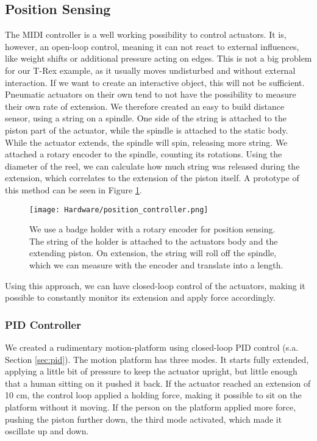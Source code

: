 \subsection{Position Sensing}
The MIDI controller is a well working possibility to control actuators. It is, however, an open-loop control, meaning it can not react to external influences, like weight shifts or additional pressure acting on edges. This is not a big problem for our T-Rex example, as it usually moves undisturbed and without external interaction. If we want to create an interactive object, this will not be sufficient.\\
Pneumatic actuators on their own tend to not have the possibility to measure their own rate of extension. We therefore created an easy to build distance sensor, using a string on a spindle. One side of the string is attached to the piston part of the actuator, while the spindle is attached to the static body. While the actuator extends, the spindle will spin, releasing more string. We attached a rotary encoder to the spindle, counting its rotations. Using the diameter of the reel, we can calculate how much string was released during the extension, which correlates to the extension of the piston itself. A prototype of this method can be seen in Figure \ref{fig:position_control}.\\
\begin{figure}[ht!]
    \texttt{[image: Hardware/position\_controller.png]}
    \centering
    \caption{We use a badge holder with a rotary encoder for position sensing. The string of the holder is attached to the actuators body and the extending piston. On extension, the string will roll off the spindle, which we can measure with the encoder and translate into a length.}
    \label{fig:position_control}
\end{figure}
Using this approach, we can have closed-loop control of the actuators, making it possible to constantly monitor its extension and apply force accordingly.

\subsubsection{PID Controller}
We created a rudimentary motion-platform using closed-loop PID control (s.a. Section \ref{sec:pid}). The motion platform has three modes. It starts fully extended, applying a little bit of pressure to keep the actuator upright, but little enough that a human sitting on it pushed it back. If the actuator reached an extension of 10 cm, the control loop applied a holding force, making it possible to sit on the platform without it moving. If the person on the platform applied more force, pushing the piston further down, the third mode activated, which made it oscillate up and down.

